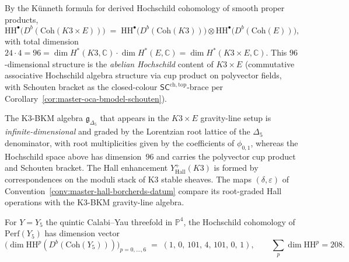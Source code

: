 \begin{remark}
\label{rem:master-oca-k3-e-kunneth}
By the K{\"u}nneth formula for derived Hochschild cohomology of
smooth proper products,
\[
\mathrm{HH}^\bullet\bigl(D^b(\mathrm{Coh}(K3 \times E))\bigr)
\;=\;
\mathrm{HH}^\bullet\bigl(D^b(\mathrm{Coh}(K3))\bigr) \otimes
\mathrm{HH}^\bullet\bigl(D^b(\mathrm{Coh}(E))\bigr),
\]
with total dimension $24 \cdot 4 = 96 = \dim H^*(K3, \mathbb C)
\cdot \dim H^*(E, \mathbb C) = \dim H^*(K3 \times E, \mathbb C)$.
This $96$-dimensional structure is the \emph{abelian Hochschild}
content of $K3 \times E$ \textup{(}commutative associative Hochschild
algebra structure via cup product on polyvector fields, with Schouten
bracket as the closed-colour
$\mathsf{SC}^{\mathrm{ch,top}}$-brace per
Corollary~\ref{cor:master-oca-bmodel-schouten}\textup{).}

The K3-BKM algebra $\mathfrak g_{\Delta_5}$ that appears in the
$K3 \times E$ gravity-line setup is \emph{infinite-dimensional}
and graded by the Lorentzian root lattice of the $\Delta_5$
denominator, with root multiplicities given by the coefficients of
$\phi_{0,1}$,
whereas the Hochschild space above has dimension~$96$ and carries the
polyvector cup product and Schouten bracket.  The Hall enhancement
$Y^+_{\mathrm{Hall}}(K3)$ is formed by correspondences on the moduli
stack of K3 stable sheaves.  The maps $(\delta,\varepsilon)$ of
Convention~\ref{conv:master-hall-borcherds-datum} compare its
root-graded Hall operations with the K3-BKM gravity-line algebra.
\end{remark}

\begin{corollary}
\label{cor:master-oca-quintic}
For $Y = Y_5$ the quintic Calabi--Yau threefold in $\mathbb P^4$, the
Hochschild cohomology of $\mathrm{Perf}(Y_5)$ has dimension vector
\[
\bigl(\dim \mathrm{HH}^p(D^b(\mathrm{Coh}(Y_5)))\bigr)_{p = 0,\ldots,6}
\;=\;
(1,\, 0,\, 101,\, 4,\, 101,\, 0,\, 1),
\qquad
\sum_p \dim \mathrm{HH}^p = 208.
\]
\end{corollary}

